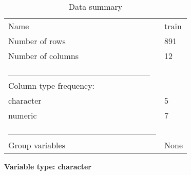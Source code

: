 \documentclass[
]{article}
\begin{document}
\begin{longtable}[]{@{}ll@{}}
\caption{Data summary}\tabularnewline
\toprule\noalign{}
\endfirsthead
\endhead
\bottomrule\noalign{}
\endlastfoot
Name & train \\
Number of rows & 891 \\
Number of columns & 12 \\
\_\_\_\_\_\_\_\_\_\_\_\_\_\_\_\_\_\_\_\_\_\_\_ & \\
Column type frequency: & \\
character & 5 \\
numeric & 7 \\
\_\_\_\_\_\_\_\_\_\_\_\_\_\_\_\_\_\_\_\_\_\_\_\_ & \\
Group variables & None \\
\end{longtable}

\textbf{Variable type: character}
\end{document}
